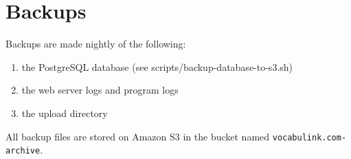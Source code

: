 \chapter{Backups}

Backups are made nightly of the following:

\begin{enumerate}
\item the PostgreSQL database (see scripts/backup-database-to-s3.sh)
\item the web server logs and program logs
\item the upload directory
\end{enumerate}

All backup files are stored on Amazon S3 in the bucket named \verb|vocabulink.com-archive|.
